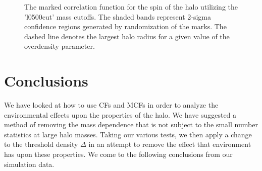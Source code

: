 \documentclass[usenatbib,usegraphicx,letterpaper]{mn2e}
\begin{document}
\begin{figure}
	\centering
	\caption{The marked correlation function for the spin of the halo utilizing the 'l0500cut' mass cutoffs. The shaded bands represent 2-sigma confidence regions generated by randomization of the marks. The dashed line denotes the largest halo radius for a given value of the overdensity parameter.}
\end{figure}



\section[]{Conclusions}
\label{section:conclusions}

We have looked at how to use CFs and MCFs in order to analyze the environmental effects upon the properties of the halo. We have suggested a method of removing the mass dependence that is not subject to the small number statistics at large halo masses. Taking our various tests, we then apply a change to the threshold density $\Delta$ in an attempt to remove the effect that environment has upon these properties. We come to the following conclusions from our simulation data.
\end{document}
